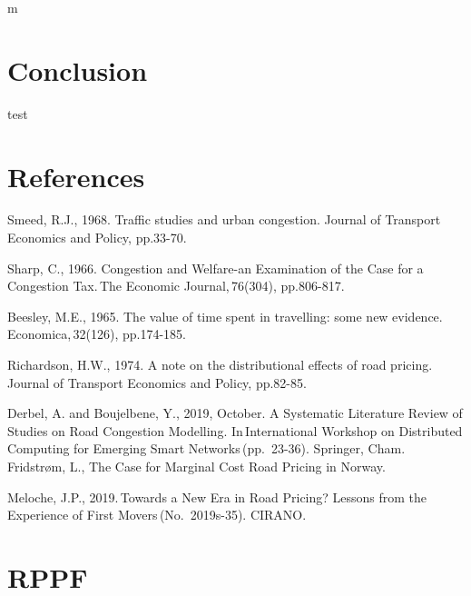 \documentclass[
  a4paper,
  12pt,
]{article}
\begin{document}
m

\hypertarget{conclusion}{%
\section{Conclusion}\label{conclusion}}

test

\hypertarget{references}{%
\section{References}\label{references}}

Smeed, R.J., 1968. Traffic studies and urban congestion. Journal of
Transport Economics and Policy, pp.33-70.

Sharp, C., 1966. Congestion and Welfare-an Examination of the Case for a
Congestion Tax.\,The Economic Journal,\,76(304), pp.806-817.

Beesley, M.E., 1965. The value of time spent in travelling: some new
evidence.\,Economica,\,32(126), pp.174-185.

Richardson, H.W., 1974. A note on the distributional effects of road
pricing.\,Journal of Transport Economics and Policy, pp.82-85.

Derbel, A. and Boujelbene, Y., 2019, October. A Systematic Literature
Review of Studies on Road Congestion Modelling. In\,International
Workshop on Distributed Computing for Emerging Smart
Networks\,(pp.~23-36). Springer, Cham. Fridstrøm, L., The Case for
Marginal Cost Road Pricing in Norway.

Meloche, J.P., 2019.\,Towards a New Era in Road Pricing? Lessons from
the Experience of First Movers\,(No.~2019s-35). CIRANO.

\hypertarget{rppf}{%
\section{RPPF}\label{rppf}}
\end{document}
